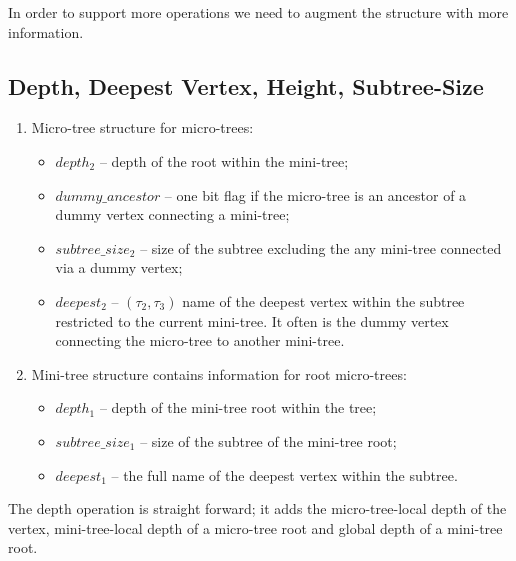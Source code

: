 \bigskip

In order to support more operations we need to augment the structure with more information.

\subsection{Depth, Deepest Vertex, Height, Subtree-Size}

\begin{enumerate}
	\item Micro-tree structure for micro-trees:
	\begin{itemize}
		\item $depth_2$ -- depth of the root within the mini-tree;
		\item $dummy\_ancestor$ -- one bit flag if the micro-tree is an ancestor of a dummy vertex connecting a mini-tree;
		\item $subtree\_size_2$ -- size of the subtree excluding the any mini-tree connected via a dummy vertex;
		\item $deepest_2$ -- $(\tau_2, \tau_3)$ name of the deepest vertex within the subtree restricted to the current mini-tree.
		It often is the dummy vertex connecting the micro-tree to another mini-tree.
	\end{itemize}
	\item Mini-tree structure contains information for root micro-trees:
	\begin{itemize}
		\item $depth_1$ -- depth of the mini-tree root within the tree;
		\item $subtree\_size_1$ -- size of the subtree of the mini-tree root;
		\item $deepest_1$ -- the full name of the deepest vertex within the subtree.
	\end{itemize}
\end{enumerate}

The depth operation is straight forward; it adds the micro-tree-local depth of the vertex, mini-tree-local depth of a micro-tree root and global depth of a mini-tree root.

\begin{algorithmic}
		\State {}
		\State {}
	\Else
		\State {}
	\EndIf
\EndFunction
\end{algorithmic}

